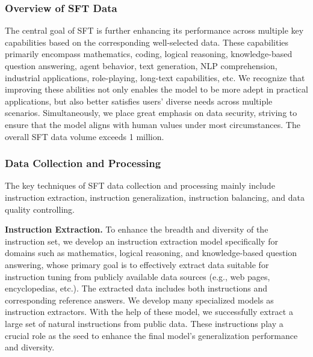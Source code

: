 \documentclass{article}
\begin{document}
\subsubsection{Overview of SFT Data}

The central goal of SFT is further enhancing its performance across multiple key capabilities based on the corresponding well-selected data. These capabilities primarily encompass mathematics, coding, logical reasoning, knowledge-based question answering, agent behavior, text generation, NLP comprehension, industrial applications, role-playing, long-text capabilities, etc. We recognize that improving these abilities not only enables the model to be more adept in practical applications, but also better satisfies users' diverse needs across multiple scenarios. Simultaneously, we place great emphasis on data security, striving to ensure that the model aligns with human values under most circumstances. The overall SFT data volume exceeds 1 million.

\subsubsection{Data Collection and Processing}

The key techniques of SFT data collection and processing mainly include instruction extraction, instruction generalization, instruction balancing, and data quality controlling.

\textbf{Instruction Extraction.}
To enhance the breadth and diversity of the instruction set, we develop an instruction extraction model specifically for domains such as mathematics, logical reasoning, and knowledge-based question answering, whose primary goal is to effectively extract data suitable for instruction tuning from publicly available data sources (e.g., web pages, encyclopedias, etc.). The extracted data includes both instructions and corresponding reference answers. We develop many specialized models as instruction extractors. With the help of these model, we successfully extract a large set of natural instructions from public data. These instructions play a crucial role as the seed to enhance the final model's generalization performance and diversity.
\end{document}
